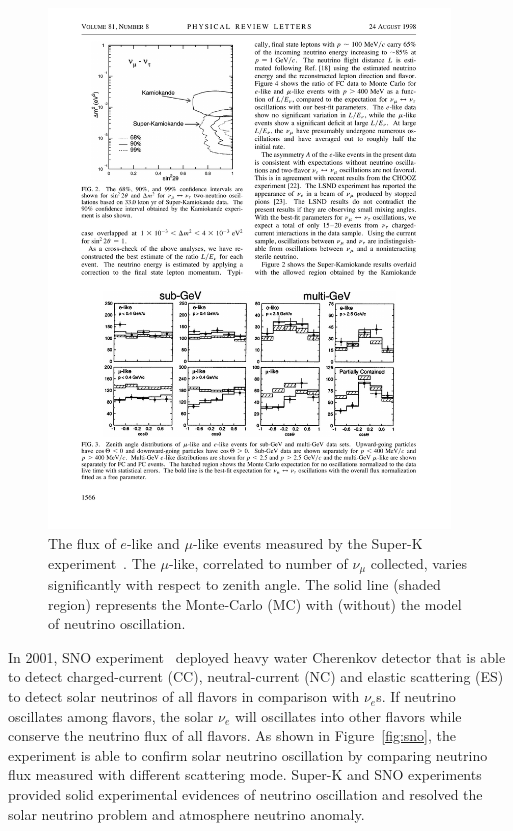 \begin{figure}[h!]
\centering
\includegraphics[width=0.95\textwidth]{Figures/SuperK.pdf}
\caption[Atmosphere neutrino oscillation]{The flux of $e$-like and $\mu$-like events measured by the Super-K experiment~\cite{bib:SuperK}. The $\mu$-like, correlated to number of $\nu_\mu$ collected, varies significantly with respect to zenith angle. The solid line (shaded region) represents the Monte-Carlo (MC) with (without) the model of neutrino oscillation.  }
\label{fig:SuperK}
\end{figure}

    In 2001, SNO experiment~\cite{bib:SNO} deployed heavy water Cherenkov detector that is able to detect charged-current (CC), neutral-current (NC) and elastic scattering (ES) to detect solar neutrinos of all flavors in comparison with $\nu_e$s.
    If neutrino oscillates among flavors, the solar $\nu_e$ will oscillates into other flavors while conserve the  neutrino flux of all flavors.
    As shown in Figure~\ref{fig:sno}, the experiment is able to confirm solar neutrino oscillation by comparing neutrino flux measured with different scattering mode.
    Super-K and SNO experiments provided solid experimental evidences of neutrino oscillation and resolved the solar neutrino problem and atmosphere neutrino anomaly.
    
